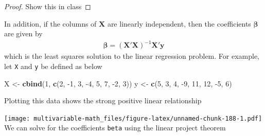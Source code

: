 \documentclass[
]{book}
\newenvironment{Shaded}{\begin{snugshade}}{\end{snugshade}}
\newcommand{\CommentTok}[1]{\textcolor[rgb]{0.56,0.35,0.01}{\textit{#1}}}
\newcommand{\DataTypeTok}[1]{\textcolor[rgb]{0.13,0.29,0.53}{#1}}
\newcommand{\DecValTok}[1]{\textcolor[rgb]{0.00,0.00,0.81}{#1}}
\newcommand{\KeywordTok}[1]{\textcolor[rgb]{0.13,0.29,0.53}{\textbf{#1}}}
\newcommand{\NormalTok}[1]{#1}
\newcommand{\OperatorTok}[1]{\textcolor[rgb]{0.81,0.36,0.00}{\textbf{#1}}}
\newcommand{\StringTok}[1]{\textcolor[rgb]{0.31,0.60,0.02}{#1}}
\theoremstyle{definition}
\theoremstyle{definition}
\theoremstyle{definition}
\theoremstyle{definition}
\theoremstyle{remark}
\begin{document}
\begin{proof}
Show this in class
\end{proof}

In addition, if the columns of \(\mathbf{X}\) are linearly independent, then the coefficients \(\boldsymbol{\beta}\) are given by
\[
\begin{aligned}
\boldsymbol{\beta} = \left( \mathbf{X}'\mathbf{X} \right)^{-1} \mathbf{X}' \mathbf{y}
\end{aligned}
\]
which is the least squares solution to the linear regression problem. For example, let \texttt{X} and \texttt{y} be defined as below

\begin{Shaded}
\begin{Highlighting}[]
\NormalTok{X <-}\StringTok{ }\KeywordTok{cbind}\NormalTok{(}\DecValTok{1}\NormalTok{, }\KeywordTok{c}\NormalTok{(}\DecValTok{2}\NormalTok{, }\DecValTok{-1}\NormalTok{, }\DecValTok{3}\NormalTok{, }\DecValTok{-4}\NormalTok{, }\DecValTok{5}\NormalTok{, }\DecValTok{7}\NormalTok{, }\DecValTok{-2}\NormalTok{, }\DecValTok{3}\NormalTok{))}
\NormalTok{y <-}\StringTok{ }\KeywordTok{c}\NormalTok{(}\DecValTok{5}\NormalTok{, }\DecValTok{3}\NormalTok{, }\DecValTok{4}\NormalTok{, }\DecValTok{-9}\NormalTok{, }\DecValTok{11}\NormalTok{, }\DecValTok{12}\NormalTok{, }\DecValTok{-5}\NormalTok{, }\DecValTok{6}\NormalTok{)}
\end{Highlighting}
\end{Shaded}

Plotting this data shows the strong positive linear relationship

\begin{Shaded}
\end{Shaded}

\texttt{[image: multivariable-math\_files/figure-latex/unnamed-chunk-188-1.pdf]}
We can solve for the coefficients \texttt{beta} using the linear project theorem

\begin{Shaded}
\end{Shaded}
\end{document}
